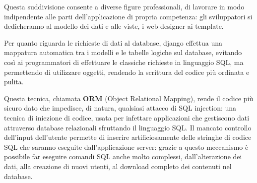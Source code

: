 \documentclass[12pt,a4paper]{article}
\begin{document}
Questa suddivisione consente a diverse figure professionali, di lavorare in modo indipendente alle parti dell’applicazione di propria competenza: gli sviluppatori si dedicheranno al modello dei dati e alle viste, i web designer ai template.

Per quanto riguarda le richieste di dati al database, django effettua una mappatura automatica tra i modelli e le tabelle logiche sul database, evitando così ai programmatori di effettuare le classiche richieste in linguaggio SQL, ma permettendo di utilizzare oggetti, rendendo la scrittura del codice più ordinata e pulita.

Questa tecnica, chiamata \textbf{ORM} (Object Relational Mapping), rende il codice più sicuro dato che impedisce, di natura, qualsiasi attacco di SQL injection: una tecnica di iniezione di codice, usata per infettare applicazioni che gestiscono dati attraverso database relazionali sfruttando il linguaggio SQL. Il mancato controllo dell'input dell'utente permette di inserire artificiosamente delle stringhe di codice SQL che saranno eseguite dall'applicazione server: grazie a questo meccanismo è possibile far eseguire comandi SQL anche molto complessi, dall'alterazione dei dati, alla creazione di nuovi utenti, al download completo dei contenuti nel database.
\end{document}
